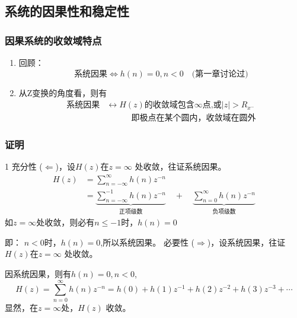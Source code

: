 \documentclass[notheorems,compress,mathserif,table]{beamer}
\begin{document}
\subsection*{系统的因果性和稳定性}
\begin{frame}[shrink]\frametitle{因果系统的收敛域特点}%
\begin{enumerate}
\item 回顾：
$$\mbox{系统因果}\Longleftrightarrow h(n)=0,n<0\quad\mbox{(第一章讨论过)}$$
\item 从Z变换的角度看，则有
\begin{equation*}
\begin{split}
\mbox{系统因果} &\longleftrightarrow   \mbox{$H(z)$的收敛域包含$\infty$点,或$|z|>R_{x^{-}}$}\\
&\quad\quad\quad       \mbox{即极点在某个圆内，收敛域在圆外}
\end{split}
\end{equation*}
\end{enumerate}
\end{frame}


\begin{frame}[allowframebreaks]\frametitle{证明}%
1 充分性 \quad($\Longleftarrow$)，设$H(z)$在$z=\infty$ 处收敛，往证系统因果。
\begin{equation}
\begin{split}
H(z) &=  \sum_{n=-\infty}^{\infty}h(n)z^{-n}\\
&=  \underbrace{\sum_{n=-\infty}^{-1}h(n)z^{-n}}_{\mbox{正项级数}} \quad
+ \quad\underbrace{\sum_{n=0}^{\infty}h(n)z^{-n}}_{\mbox{负项级数}}
\end{split}
\end{equation}
如$z=\infty$处收敛，则必有$n\leqslant -1$时，$h(n)=0$  \par
即： $n<0$时，$h(n)=0$,所以系统因果。
 必要性 \quad($\Longrightarrow$)，设系统因果，往证$H(z)$在$z=\infty$ 处收敛。
\par 因系统因果，则有$h(n)=0,n<0$,
$$H(z)=\sum_{n=0}^{\infty}h(n)z^{-n}= h(0)+h(1)z^{-1}+h(2)z^{-2}+h(3)z^{-3}+\cdots$$
显然，在$z=\infty$处，$H(z)$ 收敛。

\end{frame}
\end{document}
